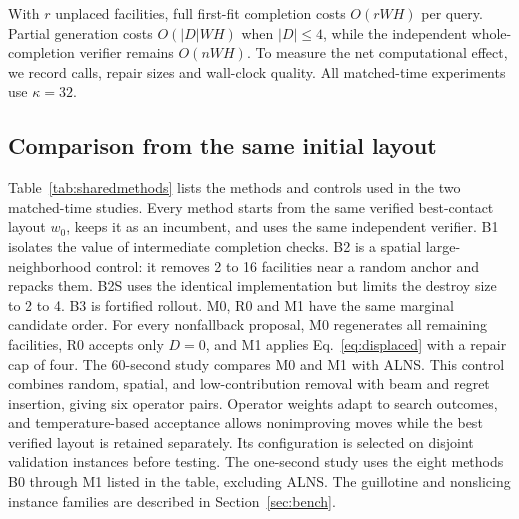 \documentclass[preprint,12pt,authoryear,nonatbib]{elsarticle}
\begin{document}
With $r$ unplaced facilities, full first-fit completion costs $O(rWH)$ per
query. Partial generation costs $O(|D|WH)$ when $|D|\le4$, while the independent
whole-completion verifier remains $O(nWH)$. To measure the net computational
effect, we record calls, repair sizes and wall-clock quality.
All matched-time experiments use $\kappa=32$.

\subsection{Comparison from the same initial layout}
\label{sec:sharedcomparison}

Table~\ref{tab:sharedmethods} lists the methods and controls used in the two
matched-time studies. Every method starts
from the same verified best-contact layout $w_0$, keeps it as an incumbent, and
uses the same independent verifier. B1 isolates the value of intermediate
completion checks. B2 is a spatial large-neighborhood control: it removes 2 to
16 facilities near a random anchor and repacks them. B2S uses the identical
implementation but limits the destroy size to 2 to 4. B3 is fortified rollout.
M0, R0 and M1 have the same marginal candidate order. For every nonfallback
proposal, M0 regenerates all remaining facilities, R0 accepts only $D=0$, and
M1 applies Eq.~\eqref{eq:displaced} with a repair cap of four.
The 60-second study compares M0 and M1 with ALNS. This control combines random,
spatial, and low-contribution removal with beam and regret insertion, giving
six operator pairs. Operator weights adapt to search outcomes, and
temperature-based acceptance allows nonimproving moves while the best verified
layout is retained separately. Its configuration is selected on disjoint
validation instances before testing. The one-second study uses the eight
methods B0 through M1 listed in the table, excluding ALNS.
The guillotine and nonslicing instance families are described in
Section~\ref{sec:bench}.
\end{document}

